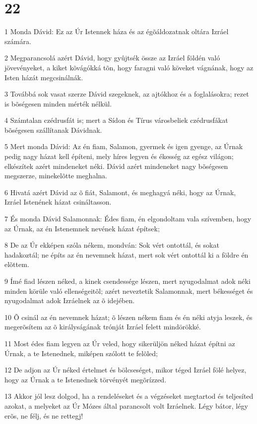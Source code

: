 \chapter{22}

\par 1 Monda Dávid: Ez az Úr Istennek háza és az égõáldozatnak oltára Izráel számára.
\par 2 Megparancsolá azért Dávid, hogy gyûjtsék össze az Izráel földén való jövevényeket, a kiket kõvágókká tõn, hogy faragni való köveket vágnának, hogy az Isten házát megcsinálnák.
\par 3 Továbbá sok vasat szerze Dávid szegeknek, az ajtókhoz és a foglalásokra; rezet is bõségesen minden mérték nélkül.
\par 4 Számtalan czédrusfát is; mert a Sídon és Tírus városbeliek czédrusfákat bõségesen szállítanak Dávidnak.
\par 5 Mert monda Dávid: Az én fiam, Salamon, gyermek és igen gyenge, az Úrnak pedig nagy házat kell építeni, mely híres legyen és ékesség az egész világon; elkészítek azért mindeneket néki. Dávid azért mindeneket nagy bõségesen megszerze, minekelõtte meghalna.
\par 6 Hivatá azért Dávid az õ fiát, Salamont, és meghagyá néki, hogy az Úrnak, Izráel Istenének házat csináltasson.
\par 7 És monda Dávid Salamonnak: Édes fiam, én elgondoltam vala szívemben, hogy az Úrnak, az én Istenemnek nevének házat építsek;
\par 8 De az Úr ekképen szóla nékem, mondván: Sok vért ontottál, és sokat hadakoztál; ne építs az én nevemnek házat, mert sok vért ontottál ki a földre én elõttem.
\par 9 Ímé fiad lészen néked, a kinek csendessége lészen, mert nyugodalmat adok néki minden körüle való ellenségeitõl; azért neveztetik Salamonnak, mert békességet és  nyugodalmat adok Izráelnek az õ idejében.
\par 10 Õ csinál az én nevemnek házat; õ lészen nékem fiam  és én néki atyja leszek, és megerõsítem az õ királyságának trónját Izráel felett mindörökké.
\par 11 Most édes fiam legyen az Úr veled, hogy sikerüljön néked házat építni az Úrnak, a te Istenednek, miképen szólott te felõled;
\par 12 De adjon az Úr néked értelmet és bölcseséget, mikor téged Izráel fölé helyez, hogy az Úrnak a te Istenednek törvényét megõrízzed.
\par 13 Akkor jól lesz dolgod, ha a rendeléseket és a végzéseket megtartod és teljesíted azokat, a melyeket az Úr Mózes által parancsolt volt Izráelnek. Légy bátor, légy erõs, ne félj, és ne rettegj!
